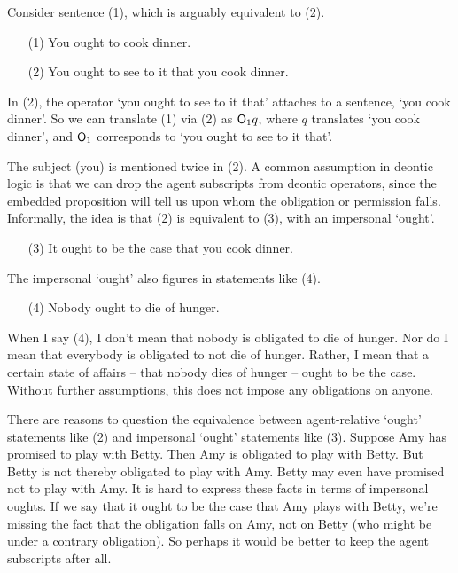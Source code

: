 Consider sentence (1), which is arguably equivalent to (2).
\begin{itemize}[leftmargin=10mm]
\itemsep-1mm
\item[(1)] You ought to cook dinner.
\item[(2)] You ought to see to it that you cook dinner.
\end{itemize}
In (2), the operator `you ought to see to it that' attaches to a sentence, `you
cook dinner'. So we can translate (1) via (2) as $\operatorname{\mathsf{O}}_1 \!q$, where $q$ translates
`you cook dinner', and $\operatorname{\mathsf{O}}_1$ corresponds to `you ought to see to it that'.

The subject (you) is mentioned twice in (2). A common assumption in deontic
logic is that we can drop the agent subscripts from deontic operators, since the
embedded proposition will tell us upon whom the obligation or permission falls.
Informally, the idea is that (2) is equivalent to (3), with an impersonal
`ought'.
\begin{itemize}[leftmargin=10mm]
\itemsep1mm
\item[(3)] It ought to be the case that you cook dinner.
\end{itemize}

The impersonal `ought' also figures in statements like (4).
\begin{itemize}[leftmargin=10mm]
\itemsep1mm
\item[(4)] Nobody ought to die of hunger.
\end{itemize}
When I say (4), I don't mean that nobody is obligated to die of hunger. Nor do I
mean that everybody is obligated to not die of hunger. Rather, I mean that a
certain state of affairs -- that nobody dies of hunger -- ought to be the case.
Without further assumptions, this does not impose any obligations on anyone.


There are reasons to question the equivalence between agent-relative `ought'
statements like (2) and impersonal `ought' statements like (3).
Suppose Amy has promised to play with Betty. Then Amy is obligated to play with
Betty. But Betty is not thereby obligated to play with Amy. Betty may even have
promised not to play with Amy. It is hard to express these facts in terms of
impersonal oughts. If we say that it ought to be the case that Amy plays with
Betty, we're missing the fact that the obligation falls on Amy, not on Betty
(who might be under a contrary obligation). So perhaps it would be better to
keep the agent subscripts after all.

